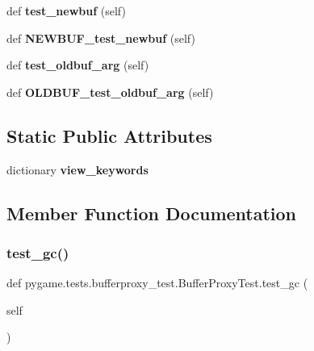 \begin{DoxyCompactItemize}
def {\bfseries test\+\_\+newbuf} (self)
\item 
\mbox{\label{classpygame_1_1tests_1_1bufferproxy__test_1_1_buffer_proxy_test_ad1fa7bc8f51e5d6359594c2efc013e68}} 
def {\bfseries N\+E\+W\+B\+U\+F\+\_\+test\+\_\+newbuf} (self)
\item 
\mbox{\label{classpygame_1_1tests_1_1bufferproxy__test_1_1_buffer_proxy_test_a998c268fb9d41f39d174b6bc49a38481}} 
def {\bfseries test\+\_\+oldbuf\+\_\+arg} (self)
\item 
\mbox{\label{classpygame_1_1tests_1_1bufferproxy__test_1_1_buffer_proxy_test_a2e1adac97c36ad4c80bf2658fc66f7b3}} 
def {\bfseries O\+L\+D\+B\+U\+F\+\_\+test\+\_\+oldbuf\+\_\+arg} (self)
\end{DoxyCompactItemize}
\subsection*{Static Public Attributes}
\begin{DoxyCompactItemize}
\item 
dictionary {\bfseries view\+\_\+keywords}
\end{DoxyCompactItemize}


\subsection{Member Function Documentation}
\mbox{\label{classpygame_1_1tests_1_1bufferproxy__test_1_1_buffer_proxy_test_a125819b5b4157a749553f3dad3206f64}} 
\subsubsection{\texorpdfstring{test\+\_\+gc()}{test\_gc()}}
{\footnotesize\ttfamily def pygame.\+tests.\+bufferproxy\+\_\+test.\+Buffer\+Proxy\+Test.\+test\+\_\+gc (\begin{DoxyParamCaption}\item[{}]{self }\end{DoxyParamCaption})}

